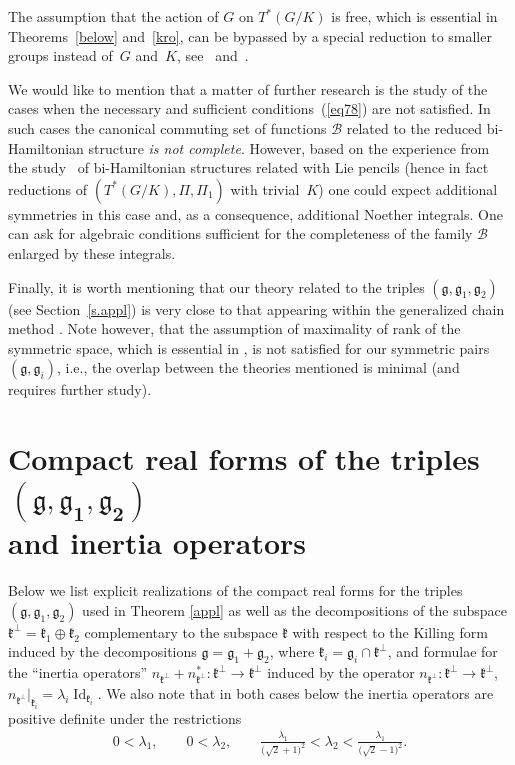 \documentclass[pdftex]{sigma}
\numberwithin{equation}{section}
\begin{document}
The assumption that the action of $G$ on $T^*(G/K)$ is free, which is essential in Theorems~\ref{below} and~\ref{kro}, can be bypassed by a special reduction to smaller groups instead of~$G$ and~$K$, see~\cite{pMyk} and~\cite{p4}.

We would like to mention that a matter of further research is the study of the cases when the necessary and sufficient conditions~(\ref{eq78}) are not satisfied. In such cases the canonical commuting set of functions $\mathcal{B}$ related to the reduced bi-Hamiltonian structure \emph{is not complete}. However, based on the experience from the study~\cite{pSymmetries} of bi-Hamiltonian structures related with Lie pencils (hence in fact reductions of $(T^*(G/K),\Pi,\Pi_1)$ with trivial~$K$) one could expect additional symmetries in this case and, as a consequence, additional Noether integrals. One can ask for algebraic conditions sufficient for the completeness of the family $\mathcal{B}$ enlarged by these integrals.

Finally, it is worth mentioning that our theory related to the triples $(\mathfrak{g},\mathfrak{g}_1,\mathfrak{g}_2)$ (see Section~\ref{s.appl}) is very close to that appearing within the generalized chain method \cite{bj3, bjObzor}. Note however, that the assumption of maximality of rank of the symmetric space, which is essential in \cite[Theorem~8.6]{bjObzor}, is not satisfied for our symmetric pairs $(\mathfrak{g},\mathfrak{g}_i)$, i.e., the overlap between the theories mentioned is minimal (and requires further study).

\appendix

\section[Compact real forms of the triples $(\mathfrak{g},\mathfrak{g}_1,\mathfrak{g}_2)$ and inertia operators]{Compact real forms of the triples $\boldsymbol{(\mathfrak{g},\mathfrak{g}_1,\mathfrak{g}_2)}$\\ and inertia operators}\label{appe}

Below we list explicit realizations of the compact real forms for the triples $(\mathfrak{g},\mathfrak{g}_1,\mathfrak{g}_2)$ used in Theorem \ref{appl} as well as the decompositions of the subspace $\mathfrak{k}^\perp=\mathfrak{k}_1\oplus\mathfrak{k}_2$ complementary to the subspace $\mathfrak{k}$ with respect to the Killing form induced by the decompositions $\mathfrak{g}=\mathfrak{g}_1+\mathfrak{g}_2$, where $\mathfrak{k}_i=\mathfrak{g}_i\cap\mathfrak{k}^\perp$, and formulae for the ``inertia operators'' $n_{\mathfrak{k}^\perp}+n^*_{\mathfrak{k}^\perp}\colon \mathfrak{k}^\perp\to\mathfrak{k}^\perp$ induced by the operator $n_{\mathfrak{k}^\perp}\colon \mathfrak{k}^\perp\to\mathfrak{k}^\perp$, $n_{\mathfrak{k}^\perp}|_{\mathfrak{k}_i}=\lambda_i\operatorname{Id}_{\mathfrak{k}_i}$. We also note that in both cases below the inertia operators are positive definite under the restrictions
\begin{gather*}
0<\lambda_1,\qquad 0<\lambda_2,\qquad
{\frac {\lambda_{1} }{\big(\sqrt {2}+1\big)^2}}< \lambda_{2}<{\frac {\lambda_{1} }{\big(\sqrt {2}-1\big)^2}}.
\end{gather*}
\end{document}

